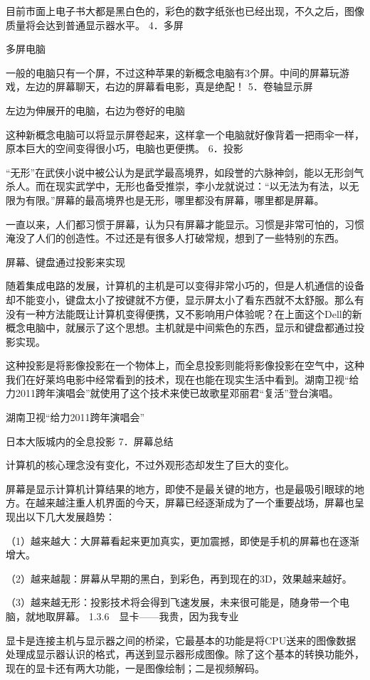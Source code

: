 \documentclass[12pt,UTF8]{ctexbook}
\begin{document}
目前市面上电子书大都是黑白色的，彩色的数字纸张也已经出现，不久之后，图像质量将会达到普通显示器水平。
4．多屏

多屏电脑

一般的电脑只有一个屏，不过这种苹果的新概念电脑有3个屏。中间的屏幕玩游戏，左边的屏幕聊天，右边的屏幕看电影，真是绝配！
5．卷轴显示屏

左边为伸展开的电脑，右边为卷好的电脑

这种新概念电脑可以将显示屏卷起来，这样拿一个电脑就好像背着一把雨伞一样，原本巨大的空间变得很小巧，电脑也更便携。
6．投影

“无形”在武侠小说中被公认为是武学最高境界，如段誉的六脉神剑，能以无形剑气杀人。而在现实武学中，无形也备受推崇，李小龙就说过：“以无法为有法，以无限为有限。”屏幕的最高境界也是无形，哪里都没有屏幕，哪里都是屏幕。

一直以来，人们都习惯于屏幕，认为只有屏幕才能显示。习惯是非常可怕的，习惯淹没了人们的创造性。不过还是有很多人打破常规，想到了一些特别的东西。

屏幕、键盘通过投影来实现

随着集成电路的发展，计算机的主机是可以变得非常小巧的，但是人机通信的设备却不能变小，键盘太小了按键就不方便，显示屏太小了看东西就不太舒服。那么有没有一种方法能既让计算机变得便携，又不影响用户体验呢？在上面这个Dell的新概念电脑中，就展示了这个思想。主机就是中间紫色的东西，显示和键盘都通过投影实现。

这种投影是将影像投影在一个物体上，而全息投影则能将影像投影在空气中，这种我们在好莱坞电影中经常看到的技术，现在也能在现实生活中看到。湖南卫视“给力2011跨年演唱会”就使用了这个技术来使已故歌星邓丽君“复活”登台演唱。

湖南卫视“给力2011跨年演唱会”

日本大阪城内的全息投影
7．屏幕总结

计算机的核心理念没有变化，不过外观形态却发生了巨大的变化。

屏幕是显示计算机计算结果的地方，即使不是最关键的地方，也是最吸引眼球的地方。在越来越注重人机界面的今天，屏幕已经逐渐成为了一个重要战场，屏幕也呈现出以下几大发展趋势：

（1）越来越大：大屏幕看起来更加真实，更加震撼，即使是手机的屏幕也在逐渐增大。

（2）越来越靓：屏幕从早期的黑白，到彩色，再到现在的3D，效果越来越好。

（3）越来越无形：投影技术将会得到飞速发展，未来很可能是，随身带一个电脑，就地取屏幕。
1.3.6　显卡——我贵，因为我专业

显卡是连接主机与显示器之间的桥梁，它最基本的功能是将CPU送来的图像数据处理成显示器认识的格式，再送到显示器形成图像。除了这个基本的转换功能外，现在的显卡还有两大功能，一是图像绘制；二是视频解码。
\end{document}
